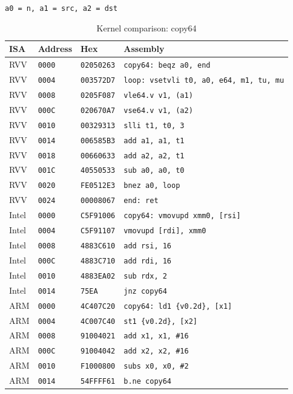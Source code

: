 \begin{table}[htbp]
\centering
\caption{Kernel comparison: copy64}
\begingroup
\scriptsize
\setlength{\tabcolsep}{4pt}
\noindent \texttt{a0 = n, a1 = src, a2 = dst}\par
\vspace{0.6ex}
\begin{tabular}{@{}l|l|l|p{7.2cm}@{}}
\toprule
ISA & Address & Hex & Assembly \\
\midrule
RVV & \texttt{0000} & \texttt{02050263} & \texttt{copy64: beqz a0, end} \\
RVV & \texttt{0004} & \texttt{003572D7} & \texttt{loop: vsetvli t0, a0, e64, m1, tu, mu} \\
RVV & \texttt{0008} & \texttt{0205F087} & \texttt{vle64.v v1, (a1)} \\
RVV & \texttt{000C} & \texttt{020670A7} & \texttt{vse64.v v1, (a2)} \\
RVV & \texttt{0010} & \texttt{00329313} & \texttt{slli t1, t0, 3} \\
RVV & \texttt{0014} & \texttt{006585B3} & \texttt{add a1, a1, t1} \\
RVV & \texttt{0018} & \texttt{00660633} & \texttt{add a2, a2, t1} \\
RVV & \texttt{001C} & \texttt{40550533} & \texttt{sub a0, a0, t0} \\
RVV & \texttt{0020} & \texttt{FE0512E3} & \texttt{bnez a0, loop} \\
RVV & \texttt{0024} & \texttt{00008067} & \texttt{end: ret} \\
\midrule
Intel & \texttt{0000} & \texttt{C5F91006} & \texttt{copy64: vmovupd xmm0, [rsi]} \\
Intel & \texttt{0004} & \texttt{C5F91107} & \texttt{vmovupd [rdi], xmm0} \\
Intel & \texttt{0008} & \texttt{4883C610} & \texttt{add rsi, 16} \\
Intel & \texttt{000C} & \texttt{4883C710} & \texttt{add rdi, 16} \\
Intel & \texttt{0010} & \texttt{4883EA02} & \texttt{sub rdx, 2} \\
Intel & \texttt{0014} & \texttt{75EA} & \texttt{jnz copy64} \\
\midrule
ARM & \texttt{0000} & \texttt{4C407C20} & \texttt{copy64: ld1 \{v0.2d\}, [x1]} \\
ARM & \texttt{0004} & \texttt{4C007C40} & \texttt{st1 \{v0.2d\}, [x2]} \\
ARM & \texttt{0008} & \texttt{91004021} & \texttt{add x1, x1, \#16} \\
ARM & \texttt{000C} & \texttt{91004042} & \texttt{add x2, x2, \#16} \\
ARM & \texttt{0010} & \texttt{F1000800} & \texttt{subs x0, x0, \#2} \\
ARM & \texttt{0014} & \texttt{54FFFF61} & \texttt{b.ne copy64} \\
\bottomrule
\end{tabular}
\endgroup
\end{table}
\noindent{}\par
